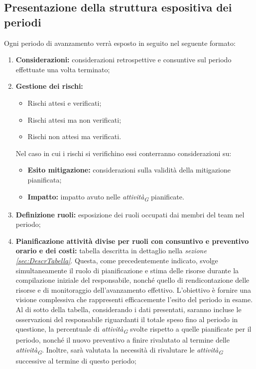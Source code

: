 \subsection{Presentazione della struttura espositiva dei periodi}
Ogni periodo di avanzamento verrà esposto in seguito nel seguente formato:
\begin{enumerate}
    \item \textbf{Considerazioni:} considerazioni retrospettive e consuntive sul periodo effettuate una volta terminato;

    \pagebreak
    
    \item \textbf{Gestione dei rischi:}
            \begin{itemize}
                \item Rischi attesi e verificati;
                \item Rischi attesi ma non verificati;
                \item Rischi non attesi ma verificati.
            \end{itemize}
        Nel caso in cui i rischi si verifichino essi conterranno considerazioni su:
        \begin{itemize}
            \item \textbf{Esito mitigazione:} considerazioni sulla validità della mitigazione pianificata;
            \item \textbf{Impatto:} impatto avuto nelle \textit{attività}\textsubscript{\textit{G}} pianificate.
        \end{itemize}
    \item \textbf{Definizione ruoli:} esposizione dei ruoli occupati dai membri del team nel periodo;
    \item \textbf{Pianificazione attività divise per ruoli con consuntivo e preventivo orario e dei costi:} tabella descritta in dettaglio nella \textit{sezione \ref{sec:DescrTabella}}.
    Questa, come precedentemente indicato, svolge simultaneamente il ruolo di pianificazione e stima delle risorse durante la compilazione iniziale del responsabile, nonché quello di rendicontazione delle risorse e di monitoraggio dell'avanzamento effettivo. L'obiettivo è fornire una visione complessiva che rappresenti efficacemente l'esito del periodo in esame.
    Al di sotto della tabella, considerando i dati presentati, saranno incluse le osservazioni del responsabile riguardanti il totale speso fino al periodo in questione, la percentuale di \textit{attività}\textsubscript{\textit{G}} svolte rispetto a quelle pianificate per il periodo, nonché il nuovo preventivo a finire rivalutato al termine delle \textit{attività}\textsubscript{\textit{G}}. Inoltre, sarà valutata la necessità di rivalutare le \textit{attività}\textsubscript{\textit{G}} successive al termine di questo periodo;

\end{enumerate}
